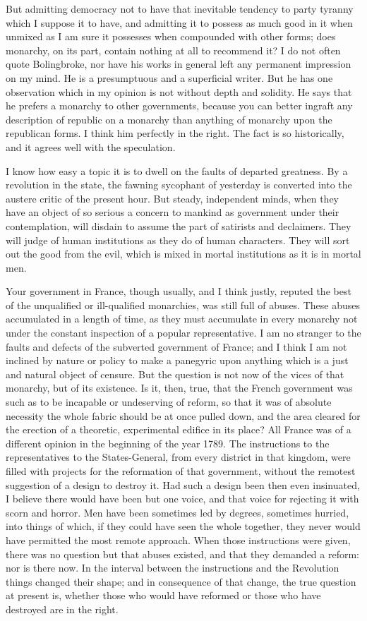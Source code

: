 But admitting democracy not to have that inevitable tendency to party tyranny which I suppose it to have, and admitting it to possess as much good in it when unmixed as I am sure it possesses when compounded with other forms; does monarchy, on its part, contain nothing at all to recommend it? I do not often quote Bolingbroke, nor have his works in general left any permanent impression on my mind. He is a presumptuous and a superficial writer. But he has one observation which in my opinion is not without depth and solidity. He says that he prefers a monarchy to other governments, because you can better ingraft any description of republic on a monarchy than anything of monarchy upon the republican forms. I think him perfectly in the right. The fact is so historically, and it agrees well with the speculation.

I know how easy a topic it is to dwell on the faults of departed greatness. By a revolution in the state, the fawning sycophant of yesterday is converted into the austere critic of the present hour. But steady, independent minds, when they have an object of so serious a concern to mankind as government under their contemplation, will disdain to assume the part of satirists and declaimers. They will judge of human institutions as they do of human characters. They will sort out the good from the evil, which is mixed in mortal institutions as it is in mortal men.

Your government in France, though usually, and I think justly, reputed the best of the unqualified or ill-qualified monarchies, was still full of abuses. These abuses accumulated in a length of time, as they must accumulate in every monarchy not under the constant inspection of a popular representative. I am no stranger to the faults and defects of the subverted government of France; and I think I am not inclined by nature or policy to make a panegyric upon anything which is a just and natural object of censure. But the question is not now of the vices of that monarchy, but of its existence. Is it, then, true, that the French government was such as to be incapable or undeserving of reform, so that it was of absolute necessity the whole fabric should be at once pulled down, and the area cleared for the erection of a theoretic, experimental edifice in its place? All France was of a different opinion in the beginning of the year 1789. The instructions to the representatives to the States-General, from every district in that kingdom, were filled with projects for the reformation of that government, without the remotest suggestion of a design to destroy it. Had such a design been then even insinuated, I believe there would have been but one voice, and that voice for rejecting it with scorn and horror. Men have been sometimes led by degrees, sometimes hurried, into things of which, if they could have seen the whole together, they never would have permitted the most remote approach. When those instructions were given, there was no question but that abuses existed, and that they demanded a reform: nor is there now. In the interval between the instructions and the Revolution things changed their shape; and in consequence of that change, the true question at present is, whether those who would have reformed or those who have destroyed are in the right.

